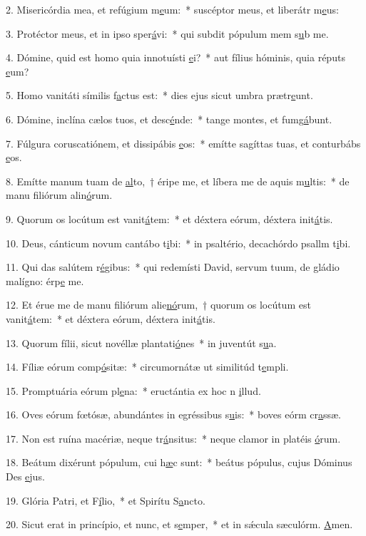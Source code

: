 2. Misericórdia mea, et refúgium m\uline{e}um:~* suscéptor meus, et liberátr m\uline{e}us:\par 
3. Protéctor meus, et in ipso sper\uline{á}vi:~* qui subdit pópulum mem s\uline{u}b me.\par 
4. Dómine, quid est homo quia innotuísti \uline{e}i?~* aut fílius hóminis, quia réputs \uline{e}um?\par 
5. Homo vanitáti símilis f\uline{a}ctus est:~* dies ejus sicut umbra prætr\uline{e}unt.\par 
6. Dómine, inclína cælos tuos, et desc\uline{é}nde:~* tange montes, et fumg\uline{á}bunt.\par 
7. Fúlgura coruscatiónem, et dissipábis \uline{e}os:~* emítte sagíttas tuas, et conturbábs \uline{e}os.\par 
8. Emítte manum tuam de \uline{al}to,~† éripe me, et líbera me de aquis m\uline{u}ltis:~* de manu filiórum alin\uline{ó}rum.\par 
9. Quorum os locútum est vanit\uline{á}tem:~* et déxtera eórum, déxtera init\uline{á}tis.\par 
10. Deus, cánticum novum cantábo t\uline{i}bi:~* in psaltério, decachórdo psallm t\uline{i}bi.\par 
11. Qui das salútem r\uline{é}gibus:~* qui redemísti David, servum tuum, de gládio malígno: érp\uline{e} me.\par 
12. Et érue me de manu filiórum alie\uline{nó}rum,~† quorum os locútum est vanit\uline{á}tem:~* et déxtera eórum, déxtera init\uline{á}tis.\par 
13. Quorum fílii, sicut novéllæ plantati\uline{ó}nes~* in juventút s\uline{u}a.\par 
14. Fíliæ eórum comp\uline{ó}sitæ:~* circumornátæ ut similitúd t\uline{e}mpli.\par 
15. Promptuária eórum pl\uline{e}na:~* eructántia ex hoc n \uline{i}llud.\par 
16. Oves eórum fœtósæ, abundántes in egréssibus s\uline{u}is:~* boves eórm cr\uline{a}ssæ.\par 
17. Non est ruína macériæ, neque tr\uline{á}nsitus:~* neque clamor in platéis \uline{ó}rum.\par 
18. Beátum dixérunt pópulum, cui h\uline{æ}c sunt:~* beátus pópulus, cujus Dóminus Des \uline{e}jus.\par 
19. Glória Patri, et F\uline{í}lio,~* et Spirítu S\uline{a}ncto.\par 
20. Sicut erat in princípio, et nunc, et s\uline{e}mper,~* et in sǽcula sæculórm. \uline{A}men.\par 
